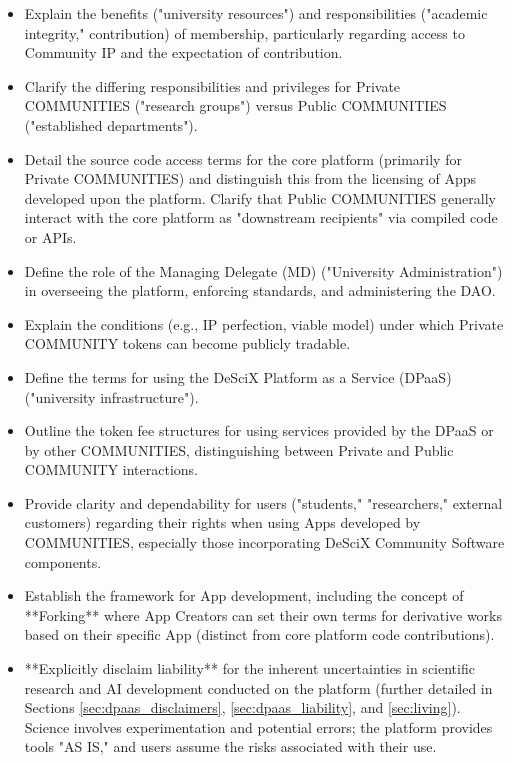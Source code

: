 \documentclass{article}
\begin{document}
\begin{itemize}
    \item Explain the benefits ("university resources") and responsibilities ("academic integrity," contribution) of membership, particularly regarding access to Community IP and the expectation of contribution.
    \item Clarify the differing responsibilities and privileges for Private COMMUNITIES ("research groups") versus Public COMMUNITIES ("established departments").
    \item Detail the source code access terms for the core platform (primarily for Private COMMUNITIES) and distinguish this from the licensing of Apps developed upon the platform. Clarify that Public COMMUNITIES generally interact with the core platform as "downstream recipients" via compiled code or APIs.
    \item Define the role of the Managing Delegate (MD) ("University Administration") in overseeing the platform, enforcing standards, and administering the DAO.
    \item Explain the conditions (e.g., IP perfection, viable model) under which Private COMMUNITY tokens can become publicly tradable.
    \item Define the terms for using the DeSciX Platform as a Service (DPaaS) ("university infrastructure").
    \item Outline the token fee structures for using services provided by the DPaaS or by other COMMUNITIES, distinguishing between Private and Public COMMUNITY interactions.
    \item Provide clarity and dependability for users ("students," "researchers," external customers) regarding their rights when using Apps developed by COMMUNITIES, especially those incorporating DeSciX Community Software components.
    \item Establish the framework for App development, including the concept of **Forking** where App Creators can set their own terms for derivative works based on their specific App (distinct from core platform code contributions).
    \item **Explicitly disclaim liability** for the inherent uncertainties in scientific research and AI development conducted on the platform (further detailed in Sections \ref{sec:dpaas_disclaimers}, \ref{sec:dpaas_liability}, and \ref{sec:living}). Science involves experimentation and potential errors; the platform provides tools "AS IS," and users assume the risks associated with their use.
\end{itemize}
\end{document}
